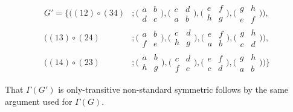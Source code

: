 \begin{example}
\begin{align*}
G' = \{ \bigl((12) \circ (34) &; \bigl(\begin{smallmatrix} a & b \\ d & c \end{smallmatrix}\bigr), \bigl(\begin{smallmatrix} c & d \\ a & b \end{smallmatrix}\bigr), \bigl(\begin{smallmatrix} e & f \\ h & g \end{smallmatrix}\bigr), \bigl(\begin{smallmatrix} g & h \\ e & f \end{smallmatrix}\bigr)\bigr), \\
               \bigl((13) \circ (24) &; \bigl(\begin{smallmatrix} a & b \\ f & e \end{smallmatrix}\bigr), \bigl(\begin{smallmatrix} c & d \\ h & g \end{smallmatrix}\bigr), \bigl(\begin{smallmatrix} e & f \\ a & b \end{smallmatrix}\bigr), \bigl(\begin{smallmatrix} g & h \\ c & d \end{smallmatrix}\bigr)\bigr), \\
               \bigl((14) \circ (23) &; \bigl(\begin{smallmatrix} a & b \\ h & g \end{smallmatrix}\bigr), \bigl(\begin{smallmatrix} c & d \\ f & e \end{smallmatrix}\bigr), \bigl(\begin{smallmatrix} e & f \\ c & d \end{smallmatrix}\bigr), \bigl(\begin{smallmatrix} g & h \\ a & b \end{smallmatrix}\bigr)\bigr)\}
\end{align*}

That $\Gamma(G')$ is only-transitive non-standard symmetric follows by the same argument used for $\Gamma(G)$. 
\end{example}

